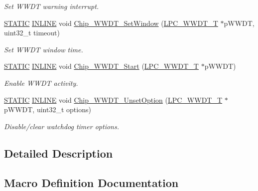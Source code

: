 \begin{DoxyCompactItemize}
\begin{DoxyCompactList}\small\item\em Set W\+W\+DT warning interrupt. \end{DoxyCompactList}\item 
\hyperlink{group__LPC__Types__Public__Macros_ga10b2d890d871e1489bb02b7e70d9bdfb}{S\+T\+A\+T\+IC} \hyperlink{group__LPC__Types__Public__Types_ga2eb6f9e0395b47b8d5e3eeae4fe0c116}{I\+N\+L\+I\+NE} void \hyperlink{group__WWDT__17XX__40XX_gaad121c7d4960ceec5626e8bad047c966}{Chip\+\_\+\+W\+W\+D\+T\+\_\+\+Set\+Window} (\hyperlink{structLPC__WWDT__T}{L\+P\+C\+\_\+\+W\+W\+D\+T\+\_\+T} $\ast$p\+W\+W\+DT, uint32\+\_\+t timeout)
\begin{DoxyCompactList}\small\item\em Set W\+W\+DT window time. \end{DoxyCompactList}\item 
\hyperlink{group__LPC__Types__Public__Macros_ga10b2d890d871e1489bb02b7e70d9bdfb}{S\+T\+A\+T\+IC} \hyperlink{group__LPC__Types__Public__Types_ga2eb6f9e0395b47b8d5e3eeae4fe0c116}{I\+N\+L\+I\+NE} void \hyperlink{group__WWDT__17XX__40XX_gacae3a80bfc9430604c434d073230f577}{Chip\+\_\+\+W\+W\+D\+T\+\_\+\+Start} (\hyperlink{structLPC__WWDT__T}{L\+P\+C\+\_\+\+W\+W\+D\+T\+\_\+T} $\ast$p\+W\+W\+DT)
\begin{DoxyCompactList}\small\item\em Enable W\+W\+DT activity. \end{DoxyCompactList}\item 
\hyperlink{group__LPC__Types__Public__Macros_ga10b2d890d871e1489bb02b7e70d9bdfb}{S\+T\+A\+T\+IC} \hyperlink{group__LPC__Types__Public__Types_ga2eb6f9e0395b47b8d5e3eeae4fe0c116}{I\+N\+L\+I\+NE} void \hyperlink{group__WWDT__17XX__40XX_gae71f59b4d6dfa847411bc74f5467946c}{Chip\+\_\+\+W\+W\+D\+T\+\_\+\+Unset\+Option} (\hyperlink{structLPC__WWDT__T}{L\+P\+C\+\_\+\+W\+W\+D\+T\+\_\+T} $\ast$p\+W\+W\+DT, uint32\+\_\+t options)
\begin{DoxyCompactList}\small\item\em Disable/clear watchdog timer options. \end{DoxyCompactList}\end{DoxyCompactItemize}


\subsection{Detailed Description}


\subsection{Macro Definition Documentation}
